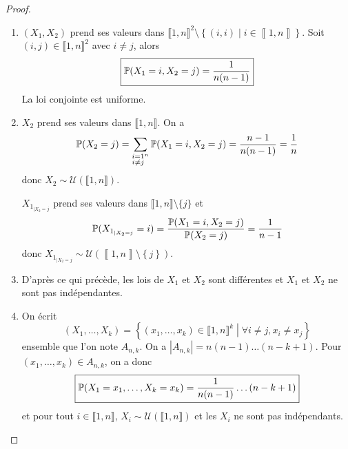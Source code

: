 \begin{proof}
    \phantom{}
    \begin{enumerate}
        \item $(X_{1},X_{2})$ prend ses valeurs dans $\llbracket1,n\rrbracket^{2}\setminus\left\lbrace(i,i)\middle| i\in\left\llbracket1,n\right\rrbracket\right\rbrace$. Soit $(i,j)\in\llbracket1,n\rrbracket^{2}$ avec $i\neq j$, alors 
        \begin{equation}
            \boxed{\P(X_{1}=i,X_{2}=j)=\frac{1}{n(n-1)}}
        \end{equation}
        La loi conjointe est uniforme.

        \item $X_{2}$ prend ses valeurs dans $\llbracket1,n\rrbracket$. On a 
        \begin{equation}
            \P(X_{2}=j)=\sum_{\substack{i=1\\i\neq j}^{n}}\P(X_{1}=i,X_{2}=j)=\frac{n-1}{n(n-1)}=\frac{1}{n}
        \end{equation}
        donc $X_{2}\sim\mathcal{U}\left(\llbracket1,n\rrbracket\right)$.

        $X_{1_{\mid X_{2}=j}}$ prend ses valeurs dans $\llbracket1,n\rrbracket\setminus\lbrace j\rbrace$ et 
        \begin{equation}
            \P(X_{1_{\mid X_{2}=j}}=i)=\frac{\P(X_{1}=i,X_{2}=j)}{\P(X_{2}=j)}=\frac{1}{n-1}
        \end{equation}
        donc $X_{1_{\mid X_{2}=j}}\sim\mathcal{U}\left(\left\llbracket1,n\right\rrbracket\setminus\left\lbrace j\right\rbrace\right)$.

        \item D'après ce qui précède, les lois de $X_{1}$ et $X_{2}$ sont différentes et $X_{1}$ et $X_{2}$ ne sont pas indépendantes.
        
        \item On écrit 
        \begin{equation}
            (X_{1},\dots,X_{k})=\left\lbrace(x_{1},\dots,x_{k})\in\llbracket1,n\rrbracket^{k}\middle| \forall i\neq j,x_{i}\neq x_{j}\right\rbrace
        \end{equation}
        ensemble que l'on note $A_{n,k}$. On a $\left\lvert A_{n,k}\right\rvert=n(n-1)\dots(n-k+1)$. Pour $(x_{1},\dots,x_{k})\in A_{n,k}$, on a donc 
        \begin{equation}
            \boxed{\P(X_{1}=x_{1},\dots,X_{k}=x_{k})=\frac{1}{n(n-1)}\dots(n-k+1)}
        \end{equation}
        et pour tout $i\in\llbracket1,n\rrbracket$, $X_{i}\sim\mathcal{U}(\llbracket1,n\rrbracket)$ et les $X_{i}$ ne sont pas indépendants.


\end{enumerate}
\end{proof}
